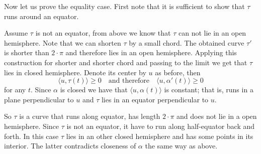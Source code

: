 Now let us prove the equality case.
First note that it is sufficient to show that $\tau$ runs around an equator.

Assume $\tau$ is not an equator, from above we know that $\tau$ can not lie in an open hemisphere.
Note that we can shorten $\tau$ by a small chord.
The obtained curve $\tau'$ is shorter than $2\cdot\pi$ and therefore lies in an open hemisphere.
Applying this construction for shorter and shorter chord and passing to the limit we get that $\tau$ lies in closed hemisphere.
Denote its center by $u$ as before, then
\[\langle u,\tau(t)\rangle\ge 0\quad\text{and therefore}\quad \langle u,\alpha'(t)\rangle\ge0\]
for any $t$.
Since $\alpha$ is closed we have that $\langle u,\alpha(t)\rangle$ is constant;
that is, runs in a plane perpendicular to $u$ and $\tau$ lies in an equator perpendicular to $u$.

So $\tau$ is a curve that runs along equator, has length $2\cdot\pi$ and does not lie in a open hemisphere.
Since $\tau$ is not an equator, it have to run along half-equator back and forth.
In this case $\tau$ lies in an other closed hemisphere and has some points in its interior.
The latter contradicts closeness of $\alpha$ the same way as above. 






